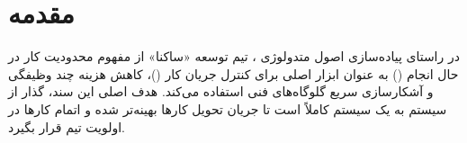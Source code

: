 \chapter{مقدمه} در راستای پیاده‌سازی اصول متدولوژی ، تیم توسعه «ساکنا» از مفهوم محدودیت کار در حال انجام () به عنوان ابزار اصلی برای کنترل جریان کار ()، کاهش هزینه چند وظیفگی و آشکارسازی سریع گلوگاه‌های فنی استفاده می‌کند. هدف اصلی این سند، گذار از سیستم  به یک سیستم کاملاً  است تا جریان تحویل کارها بهینه‌تر شده و اتمام کارها در اولویت تیم قرار بگیرد.